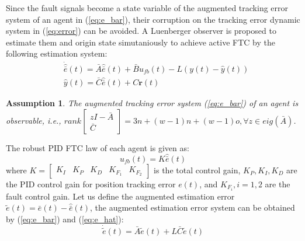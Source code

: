 \documentclass{ieeeaccess}
\newtheorem{assumption}{Assumption}[section]
\begin{document}
Since the fault signals become a state variable of the augmented tracking error system of an agent in (\ref{eq:e_bar}), their corruption on the tracking error dynamic system in (\ref{eq:error}) can be avoided. A Luenberger observer is proposed to estimate them and origin state simutaniously to achieve active FTC by the following estimation system:
\begin{equation} \label{eq:e_hat}
    \begin{split}
        & \dot{\hat{\bar{e}}}(t)=\bar{A}\hat{\bar{e}}(t)+\bar{B}u_{fb}(t)-{L}(y(t)-\hat{y}(t)) \\
        & \hat{y}(t)=\bar{C}\hat{\bar{e}}(t) + C\pmb{r}(t)
    \end{split}
\end{equation}
\begin{assumption}
    The augmented tracking error system (\ref{eq:e_bar}) of an agent is observable, i.e., $rank\begin{bmatrix}
        zI-\bar{A} \\ \bar{C}
    \end{bmatrix} = 3n + (w-1)n + (w-1)o, \forall z \in eig(\bar{A})$.
\end{assumption}
The robust PID FTC law of each agent is given as:
\begin{equation} \label{eq:u_fb}
    u_{fb}(t)=K\hat{\bar{e}}(t)
\end{equation}
where $K = \begin{bmatrix}
    K_I & K_P & K_D & K_{F_1} & K_{F_2}
\end{bmatrix}$ is the total control gain, $K_P,K_I,K_D$ are the PID control gain for position tracking error $e(t)$, and $K_{F_i}, i=1,2$ are the fault control gain. Let us define the augmented estimation error $\tilde{e}(t)=\bar{e}(t)-\hat{\bar{e}}(t)$, the augmented estimation error system can be obtained by (\ref{eq:e_bar}) and (\ref{eq:e_hat}):
\begin{equation} \label{eq:e_tilde}
    \dot{\tilde{e}}(t) = \bar{A}\tilde{e}(t) +L\bar{C}\tilde{e}(t)
\end{equation}
\end{document}
